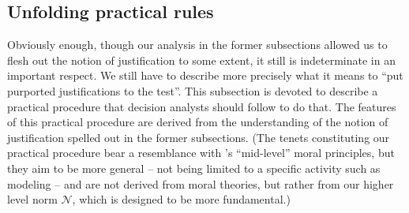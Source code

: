 \documentclass[preprint, french, english, 11pt, authoryear]{elsarticle}%
\begin{document}

\subsection{Unfolding practical rules}
Obviously enough, though our analysis in the former subsections allowed us to flesh out the notion of justification to some extent, it still is indeterminate in an important respect. 
We still have to describe more precisely what it means to ``put purported justifications to the test''. This subsection is devoted to describe a practical procedure that decision analysts should follow to do that. 
The features of this practical procedure are derived from the understanding of the notion of justification spelled out in the former subsections. 
(The tenets constituting our practical procedure bear a resemblance with \citeauthor{diekmann_moral_2013}’s \citeyearpar{diekmann_moral_2013} ``mid-level'' moral principles, but they aim to be more general -- not being limited to a specific activity such as modeling -- 
and are not derived from moral theories, but rather from our higher level norm $\mathscr{N}$, which is designed to be more fundamental.)
\end{document}
